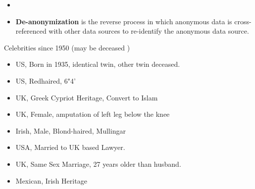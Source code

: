 \documentclass{beamer}
\begin{document}
\begin{frame}
\begin{itemize}
\item 
\item \textbf{De-anonymization} is the reverse process in which anonymous data is cross-referenced with other data sources to re-identify the anonymous data source.
\end{itemize}
\end{frame}
\begin{frame}
Celebrities since 1950 (may be deceased )
\begin{itemize}
\item US, Born in 1935,  identical twin, other twin deceased.
\item US, Redhaired, 6"4'
\item UK, Greek Cypriot Heritage, Convert to Islam
\item UK, Female, amputation of left leg below the knee
\item Irish, Male, Blond-haired, Mullingar
\item USA, Married to UK based Lawyer.
\item UK, Same Sex Marriage, 27 years older than husband.
\item Mexican, Irish Heritage
\end{itemize}

\end{frame}
\end{document}
